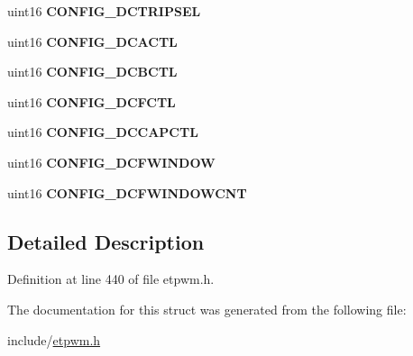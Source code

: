 \begin{DoxyCompactItemize}
uint16 {\bfseries C\+O\+N\+F\+I\+G\+\_\+\+D\+C\+T\+R\+I\+P\+S\+EL}
\item 
\mbox{\label{structetpwm__config__reg_a8a4aabce4ca6c9010c49d2d9cd5ab83b}} 
uint16 {\bfseries C\+O\+N\+F\+I\+G\+\_\+\+D\+C\+A\+C\+TL}
\item 
\mbox{\label{structetpwm__config__reg_aa784811520ce79214bd9291431d03c01}} 
uint16 {\bfseries C\+O\+N\+F\+I\+G\+\_\+\+D\+C\+B\+C\+TL}
\item 
\mbox{\label{structetpwm__config__reg_a9d66ec0760a2ce90f3849d95a7547bff}} 
uint16 {\bfseries C\+O\+N\+F\+I\+G\+\_\+\+D\+C\+F\+C\+TL}
\item 
\mbox{\label{structetpwm__config__reg_a45b6b20a7e02985374390d8db5292211}} 
uint16 {\bfseries C\+O\+N\+F\+I\+G\+\_\+\+D\+C\+C\+A\+P\+C\+TL}
\item 
\mbox{\label{structetpwm__config__reg_aad5125106b2d34f16cafe775956a7ef1}} 
uint16 {\bfseries C\+O\+N\+F\+I\+G\+\_\+\+D\+C\+F\+W\+I\+N\+D\+OW}
\item 
\mbox{\label{structetpwm__config__reg_a39b3a7121887ed9ba0b539ef5f62fa53}} 
uint16 {\bfseries C\+O\+N\+F\+I\+G\+\_\+\+D\+C\+F\+W\+I\+N\+D\+O\+W\+C\+NT}
\end{DoxyCompactItemize}


\subsection{Detailed Description}


Definition at line 440 of file etpwm.\+h.



The documentation for this struct was generated from the following file\+:\begin{DoxyCompactItemize}
\item 
include/\mbox{\hyperlink{etpwm_8h}{etpwm.\+h}}\end{DoxyCompactItemize}
